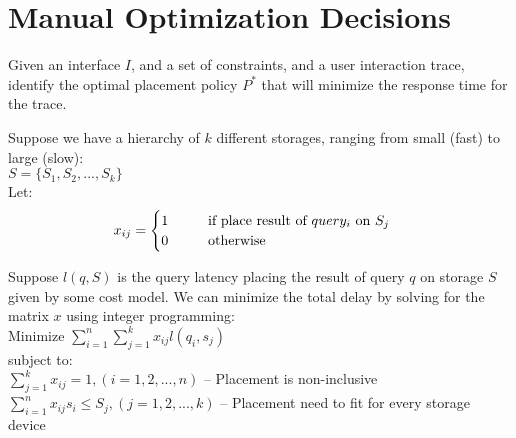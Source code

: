 


\section*{Manual Optimization Decisions}

\begin{problem}
  Given an interface $I$, and a set of constraints, and a user interaction trace, identify the optimal placement policy $P^*$ that will minimize the response time for the trace.
\end{problem}

Suppose we have a hierarchy of $k$ different storages, ranging from small (fast) to large (slow):\\

\hspace{10mm} $S=\{S_1, S_2, ..., S_k\}$\\

Let:
\begin{equation}
	x_{ij}=
	\begin{cases}
		1 \hspace{10mm} \text{if place result of $query_i$ on $S_j$} \\
		0 \hspace{10mm} \text{otherwise}
	\end{cases}
\end{equation}

Suppose $l(q, S)$ is the query latency placing the result of query $q$ on storage $S$ given by some cost model. We can minimize the total delay by solving for the matrix $x$ using integer programming:\\

\hspace{10mm} Minimize $\sum_{i=1}^{n} \sum_{j=1}^{k} x_{ij} l(q_i, s_j)$\\

subject to:\\

\hspace{10mm} $\sum_{j=1}^{k} x_{ij} = 1, (i=1,2,...,n)$ \hspace{10mm} -- Placement is non-inclusive\\

\hspace{10mm} $\sum_{i=1}^{n} x_{ij} s_i \le S_j, (j=1,2,...,k)$ \hspace{10mm} -- Placement need to fit for every storage device\\
  
